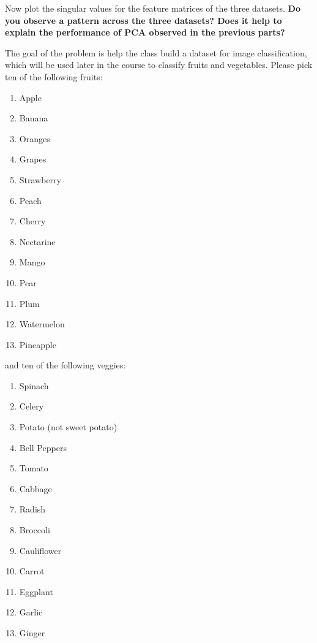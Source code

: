 \documentclass[preview]{standalone}
\begin{document}
\begin{Parts}
\Part Now plot the singular values for the feature matrices of the three datasets. 
{\bf Do you observe a pattern across the three datasets? Does it help to explain the performance
of PCA observed in the previous parts?} 


\end{Parts}






















	

The goal of the problem is help the class build a dataset for image classification, which will be used later in the course to classify fruits and vegetables. Please pick ten of the following fruits:

\begin{enumerate}
\item Apple
\item Banana
\item Oranges
\item Grapes
\item Strawberry
\item Peach
\item Cherry
\item Nectarine
\item Mango
\item Pear
\item Plum
\item Watermelon
\item Pineapple
\end{enumerate}

and ten of the following veggies:

\begin{enumerate}
\item Spinach
\item Celery
\item Potato (not sweet potato)
\item Bell Peppers
\item Tomato
\item Cabbage
\item Radish
\item Broccoli
\item Cauliflower
\item Carrot
\item Eggplant
\item Garlic
\item Ginger
\end{enumerate}
\end{document}
